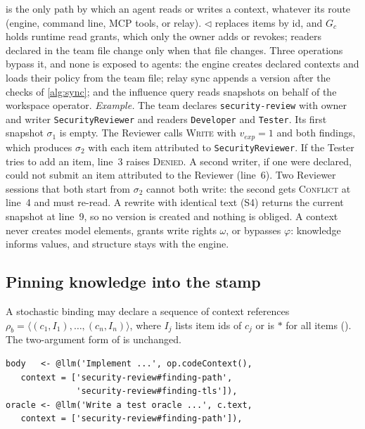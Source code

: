 \documentclass[10pt,conference]{IEEEtran}
\theoremstyle{definition}
\newcommand{\code}[1]{\texttt{#1}}
\begin{document}
 is the only path by which an agent reads or writes a context, whatever its route (engine,
command line, MCP tools, or relay). $\lhd$ replaces items by id, and $G_c$ holds runtime read grants, which
only the owner adds or revokes; readers declared in the team file change only when that file changes. Three
operations bypass it, and none is exposed to agents: the engine creates declared contexts and loads their
policy from the team file; relay sync appends a version after the checks of \cref{alg:sync}; and the
influence query reads snapshots on behalf of the workspace operator. \emph{Example.} The team declares
\code{security-review} with owner and writer \code{SecurityReviewer} and readers \code{Developer} and
\code{Tester}. Its first snapshot $\sigma_1$ is empty. The Reviewer calls \textsc{Write} with
$v_{\mathit{exp}}{=}1$ and both findings, which produces $\sigma_2$ with each item attributed to
\code{SecurityReviewer}. If the Tester tries to add an item, line~3 raises \textsc{Denied}. A second writer,
if one were declared, could not submit an item attributed to the Reviewer (line~6). Two Reviewer sessions
that both start from $\sigma_2$ cannot both write: the second gets \textsc{Conflict} at line~4 and must
re-read. A rewrite with identical text (S4) returns the current snapshot at line~9, so no version is created
and nothing is obliged. A context never creates model elements, grants write rights $\omega$, or bypasses
$\varphi$: knowledge informs values, and structure stays with the engine.

\subsection{Pinning knowledge into the stamp}\label{sec:pin}

A stochastic binding may declare a sequence of context references $\rho_b=\langle(c_1,I_1),\dots,
(c_n,I_n)\rangle$, where $I_j$ lists item ids of $c_j$ or is $*$ for all items (). The
two-argument form of  is unchanged.

\begin{lstlisting}[language=ATL, float=t,
  caption={Running example with pins: the Developer pins two items, the Tester one. Writing only
  \texttt{'security-review'} pins the whole context ($I=*$).},
  label={lst:ctxrule}]
body   <- @llm('Implement ...', op.codeContext(),
   context = ['security-review#finding-path',
              'security-review#finding-tls']),
oracle <- @llm('Write a test oracle ...', c.text,
   context = ['security-review#finding-path']),
\end{lstlisting}
\end{document}
